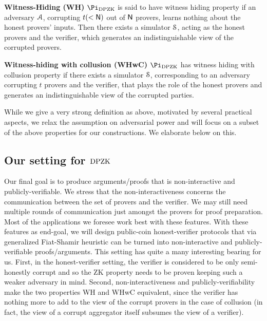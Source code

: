 {\bf Witness-Hiding (WH)} $\Pi_{\DPZK}$ is said to have witness hiding property if an adversary $\mathcal{A}$, corrupting $t( < \mathsf{N})$ out of $\mathsf{N}$ provers, learns nothing about the honest provers' inputs. Then there exists a simulator $\mathcal{S}$, acting as the honest provers and the verifier, which generates an indistinguishable view of the corrupted provers.

{\bf Witness-hiding with collusion (WHwC)} $\Pi_{\DPZK}$ has witness hiding with collusion property if there exists a simulator $\mathcal{S}$, corresponding to an adversary corrupting $t$ provers and the verifier, that plays the role of the honest provers and generates an indistinguishable view of the corrupted parties.

While we give a very strong definition as above, motivated by several practical aspects, we relax the assumption on adversarial power and will focus on a subset of the above properties for our constructions. We elaborate below on this.

\subsection{Our setting for $\text{DPZK}$}\label{subsec:our_setting}
Our final goal is to produce arguments/proofs that is non-interactive and publicly-verifiable.  We stress that the non-interactiveness concerns the communication between the set of provers and the verifier. We may still need multiple rounds of communication just amongst the provers for proof preparation.   Most of the applications we foresee work best  with these features. With these features as end-goal, we  will design public-coin honest-verifier  protocols that via generalized Fiat-Shamir heuristic \cite{FS86, BCS16} can be turned into non-interactive and publicly-verifiable proofs/arguments. This setting has quite a many interesting bearing for us. First,   in the honest-verifier setting, the verifier is considered to be only semi-honestly corrupt and so the ZK property needs to be proven keeping such a weaker adversary in mind. Second,  non-interactiveness and publicly-verifiability make the two properties WH and WHwC equivalent, since the verifier has nothing more to add to the view of the corrupt provers in the case of collusion (in fact, the view of a corrupt aggregator itself subsumes the view of a verifier). 

